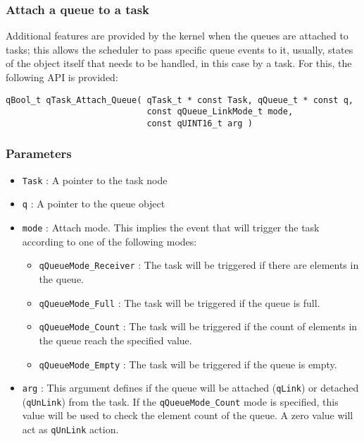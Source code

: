 \subsubsection{Attach a queue to a task}
Additional features are provided by the kernel when the queues are attached to tasks; this allows the scheduler to pass specific queue events to it, usually, states of the object itself that needs to be handled, in this case by a task. For this, the following API is provided:  
\medskip
    
\begin{lstlisting}[style=CStyle]
qBool_t qTask_Attach_Queue( qTask_t * const Task, qQueue_t * const q,
                            const qQueue_LinkMode_t mode, 
                            const qUINT16_t arg )
\end{lstlisting}
    
\subsubsection*{Parameters}
\begin{itemize}
    \item \lstinline{Task} : A pointer to the task node
    \item \lstinline{q} : A pointer to the queue object
    \item \lstinline{mode} : Attach mode. This implies the event that will trigger the task according to one of the following modes:
    \begin{itemize}
        \item \lstinline{qQueueMode_Receiver} : The task will be triggered if there are elements in the queue. 
        \item \lstinline{qQueueMode_Full} :  The task will be triggered if the queue is full. 
        \item \lstinline{qQueueMode_Count} :  The task will be triggered if the count of elements in the queue reach the specified value. 
        \item \lstinline{qQueueMode_Empty} :  The task will be triggered if the queue is empty.
    \end{itemize}
    \item \lstinline{arg} : This argument defines if the queue will be attached (\lstinline{qLink}) or detached (\lstinline{qUnLink}) from the task. If the \lstinline{qQueueMode_Count} mode is specified, this value will be used to check the element count of the queue. A zero value will act as \lstinline{qUnLink} action. 
\end{itemize}  

